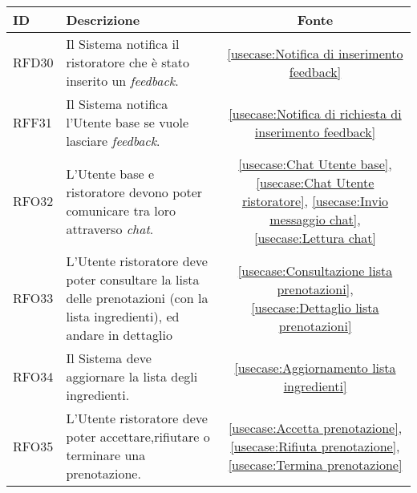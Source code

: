 \begin{table}[H]
	\renewcommand{\arraystretch}{1.5}
	\centering
	\begin{tabularx}{\textwidth}{l|X|c}
		\textbf{ID} & \textbf{Descrizione}                                                                                                           & \textbf{Fonte}                                                                                                                                        \\
		\hline
		RFD30       & Il Sistema notifica il ristoratore che è stato inserito un \textit{feedback}.                                                  & \autoref{usecase:Notifica di inserimento feedback}                                                                                                    \\
		\hline
		RFF31       & Il Sistema notifica l'Utente base se vuole lasciare \textit{feedback}.                                                         & \autoref{usecase:Notifica di richiesta di inserimento feedback}                                                                                       \\
		\hline
		RFO32       & L'Utente base e ristoratore devono poter comunicare tra loro attraverso \textit{chat}.                                         & \autoref{usecase:Chat Utente base}, \autoref{usecase:Chat Utente ristoratore}, \autoref{usecase:Invio messaggio chat}, \autoref{usecase:Lettura chat} \\
		\hline
		RFO33       & L'Utente ristoratore deve poter consultare la lista delle prenotazioni (con la lista ingredienti), ed andare in dettaglio      & \autoref{usecase:Consultazione lista prenotazioni}, \autoref{usecase:Dettaglio lista prenotazioni}                                                    \\
		\hline
		RFO34       & Il Sistema deve aggiornare la lista degli ingredienti.                                                                         & \autoref{usecase:Aggiornamento lista ingredienti}                                                                                                     \\
		\hline
		RFO35       & L'Utente ristoratore deve poter accettare,rifiutare o terminare una prenotazione.                                              & \autoref{usecase:Accetta prenotazione}, \autoref{usecase:Rifiuta prenotazione}, \autoref{usecase:Termina prenotazione}                                \\

\end{tabularx}
\end{table}
